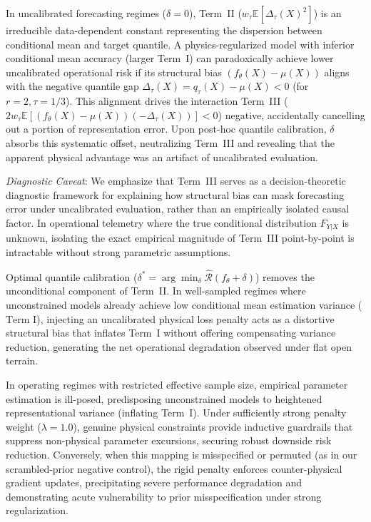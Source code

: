 \begin{remark}
\label{rem:masking}
In uncalibrated forecasting regimes ($\delta=0$), Term~II ($w_\tau \mathbb{E}[\Delta_\tau(X)^2]$) is an irreducible data-dependent constant representing the dispersion between conditional mean and target quantile. A physics-regularized model with inferior conditional mean accuracy (larger Term~I) can paradoxically achieve lower uncalibrated operational risk if its structural bias $(f_\theta(X) - \mu(X))$ aligns with the negative quantile gap $\Delta_\tau(X) = q_\tau(X) - \mu(X) < 0$ (for $r=2, \tau=1/3$). This alignment drives the interaction Term~III ($2 w_\tau \mathbb{E}[(f_\theta(X) - \mu(X))(-\Delta_\tau(X))] < 0$) negative, accidentally cancelling out a portion of representation error. Upon post-hoc quantile calibration, $\delta$ absorbs this systematic offset, neutralizing Term~III and revealing that the apparent physical advantage was an artifact of uncalibrated evaluation.

\textit{Diagnostic Caveat}: We emphasize that Term~III serves as a decision-theoretic diagnostic framework for explaining how structural bias can mask forecasting error under uncalibrated evaluation, rather than an empirically isolated causal factor. In operational telemetry where the true conditional distribution $F_{Y|X}$ is unknown, isolating the exact empirical magnitude of Term~III point-by-point is intractable without strong parametric assumptions.
\end{remark}

\begin{remark}
\label{rem:exposure}
Optimal quantile calibration ($\delta^* = \arg\min_\delta \hat{\mathcal{R}}(f_\theta + \delta)$) removes the unconditional component of Term~II. In well-sampled regimes where unconstrained models already achieve low conditional mean estimation variance ($\text{Term~I}$), injecting an uncalibrated physical loss penalty acts as a distortive structural bias that inflates Term~I without offering compensating variance reduction, generating the net operational degradation observed under flat open terrain.
\end{remark}

\begin{remark}
\label{rem:inductive_guardrails}
In operating regimes with restricted effective sample size, empirical parameter estimation is ill-posed, predisposing unconstrained models to heightened representational variance (inflating Term~I). Under sufficiently strong penalty weight ($\lambda=1.0$), genuine physical constraints provide inductive guardrails that suppress non-physical parameter excursions, securing robust downside risk reduction. Conversely, when this mapping is misspecified or permuted (as in our scrambled-prior negative control), the rigid penalty enforces counter-physical gradient updates, precipitating severe performance degradation and demonstrating acute vulnerability to prior misspecification under strong regularization.
\end{remark}

